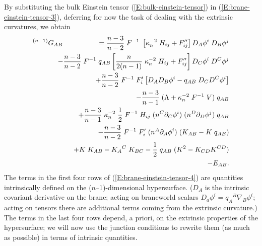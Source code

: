 \documentclass[a4paper,10pt]{article}
\begin{document}
{By substituting the bulk Einstein tensor
(\ref{E:bulk-einstein-tensor}) in (\ref{E:brane-einstein-tensor-3}),
deferring for now the task of dealing with the extrinsic curvatures,
we obtain
% 
\begin{eqnarray}
{}^{(n-1)}G_{AB}
&&\hspace{-6mm}
=
{n-3 \over n-2} \;F^{-1} \; 
\left[\kappa_n^{-2}\;H_{ij}+F''_{ij}\right] D_A \phi^i \; D_B \phi^j 
\nonumber \\
&&\hspace{-6mm}
- 
{n-3 \over n-2} \; F^{-1} \; q_{AB}
\left[{n\over 2(n-1) }\; \kappa_n^{-2}\; H_{ij}+ F''_{ij}\right] 
D_C \phi^i \; D^C \phi^j 
\nonumber \\
&&\hspace{-6mm}
+
{n-3 \over n-2} \; F^{-1} \;F'_i
\left[  D_A D_B \phi^i - q_{AB} \; 
D_C D^C \phi^i \right]  
\nonumber \\
&&\hspace{-6mm}
-
{n-3 \over n-1} \;(\Lambda + \kappa_n^{-2}\;F^{-1} \; V) \; q_{AB} 
\nonumber \\
&&\hspace{-6mm}
+ 
{n-3 \over n-1} \; \kappa_n^{-2}\; {1\over2} \; F^{-1} \;H_{ij} \;
(n^C\partial_C \phi^i) \; (n^D\partial_D \phi^j) \; q_{AB}
\nonumber \\
&&\hspace{-6mm}
-
{n-3 \over n-2} \; F^{-1} \;F'_i \; (n^A\partial_A \phi^i) \; (K_{AB}-K \; q_{AB})
\nonumber \\
&&\hspace{-6mm}
+
K\;K_{AB}-K_{A}{}^{C} \; K_{BC} 
- {1 \over 2} \; q_{AB}\;( K^2- K_{CD} K^{CD}) 
\nonumber \\
&&\hspace{-6mm}
-E_{AB}.
\label{E:brane-einstein-tensor-4}
\end{eqnarray}
%
The terms in the first four rows of (\ref{E:brane-einstein-tensor-4}) are
quantities intrinsically defined on the ($n$--1)-dimensional
hypersurface. ($D_A$ is the intrinsic covariant derivative on the
brane; acting on braneworld scalars $D_a \phi^i = q_A{}^B \nabla_B
\phi^i$; acting on tensors there are additional terms coming from the
extrinsic curvature.) The terms in the last four rows depend, a
priori, on the extrinsic properties of the hypersurface; we will now
use the junction conditions to rewrite them (as much as possible) in
terms of intrinsic quantities.

}
\end{document}
